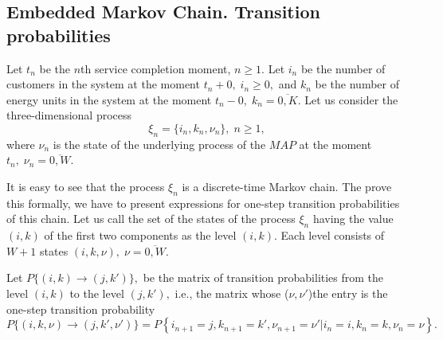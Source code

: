 \documentclass[12pt, a4paper]{article}
\begin{document}
\subsection{Embedded Markov Chain. Transition probabilities}

Let $t_n$ be the $n$th service completion moment, $n \ge 1.$ Let $i_n$ be the number of customers in the system at the moment $t_n+0,\; i_n \ge 0,$ and $k_n$ be the number of energy units in the system at the moment $t_n-0,\; k_n=\overline{0,K}.$ Let us consider the three-dimensional process
$$
\xi_n=\{i_n,k_n,\nu_n\},\; n \ge1,
$$
where $\nu_n$ is the state of the underlying process of the $MAP$ at the moment $t_n,\; \nu_n=\overline{0,W}.$

It is easy to see that the process $\xi_n$ is a discrete-time Markov chain. The prove this formally, we have to present expressions for one-step transition probabilities of this chain. Let us call the set of the states of the process $\xi_n$ having the value $(i,k)$ of the first two components as the level $(i,k).$ Each level consists of $W+1$ states $(i,k,\nu),\; \nu=\overline{0,W}.$

Let $P\{(i,k) \to (j, k')\},$ be the matrix of transition probabilities from the level $(i,k)$ to the level $(j, k'),$ i.e., the matrix whose ($\nu,\nu'$)the entry is the one-step transition probability  $$P\{ (i ,k, \nu) \to (j, k', \nu')\} =P\left\{i_{n+1} = j, k_{n+1} = k', \nu_{n+1} = \nu' |i_{n} = i, k_{n} = k, \nu_{n} = \nu \right\}.$$
\end{document}

